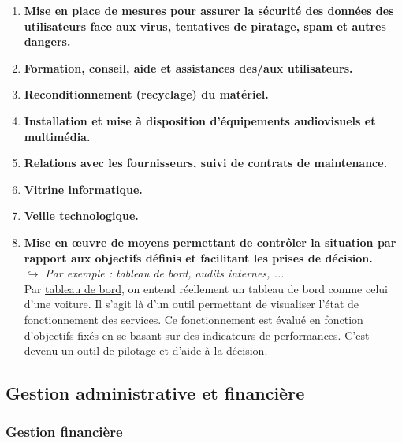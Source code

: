 \documentclass[10pt,a4paper,oneside,titlepage]{report}
\newcommand{\titre}[1]{\textcolor{title}{#1}}
\newcommand{\newterm}[1]{\textit{#1}}
\newcommand{\strong}[1]{\textbf{\titre{#1}}}
\begin{document}
\begin{sffamily}
\begin{enumerate}
\item \strong{Mise en place de mesures pour assurer la sécurité des données des utilisateurs face aux virus, tentatives de piratage, spam et autres dangers.} \\

\item \strong{Formation, conseil, aide et assistances des/aux utilisateurs.} \\

\item \strong{Reconditionnement (recyclage) du matériel.} \\

\item \strong{Installation et mise à disposition d'équipements audiovisuels et multimédia.} \\

\item \strong{Relations avec les fournisseurs, suivi de contrats de maintenance.} \\

\item \strong{Vitrine informatique.} \\

\item \strong{Veille technologique.} \\

\item \strong{Mise en \oe uvre de moyens permettant de contrôler la situation par rapport aux objectifs définis et facilitant les prises de décision.} \\
$\hookrightarrow$ \newterm{Par exemple : tableau de bord, audits internes, ... } \\
Par \underline{tableau de bord}, on entend réellement un tableau de bord comme celui d'une voiture. Il s'agit là d'un outil permettant de visualiser l'état de 
fonctionnement des services. Ce fonctionnement est évalué en fonction d'objectifs fixés en se basant sur des indicateurs de performances. C'est devenu un outil de pilotage 
et d'aide à la décision.
\end{enumerate}

\subsection{Gestion administrative et financière}

\subsubsection{Gestion financière}


\end{sffamily}
\end{document}
